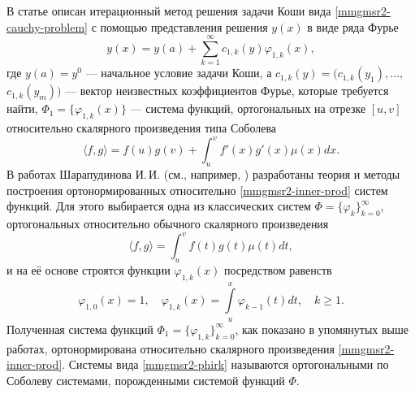 В статье \cite{mmgmsr2-SHII-Demi2017-ODESystems} описан итерационный метод решения задачи Коши вида \eqref{mmgmsr2-cauchy-problem} с помощью представления решения $y(x)$ в виде ряда Фурье
\begin{equation}\label{mmgmsr2-fourier-series-r=1}
y(x) = y(a)+\sum\limits_{k=1}^{\infty}c_{1,k}(y)\varphi_{1,k}(x),
\end{equation}
где $y(a)=y^0$ --- начальное условие задачи Коши, а $c_{1,k}(y)=(c_{1,k}(y_1),\ldots,$$c_{1,k}(y_m))$ --- вектор неизвестных коэффициентов Фурье, которые требуется найти, $\Phi_1=\{\varphi_{1,k}(x)\}$ --- система функций, ортогональных на отрезке $[u,v]$ относительно скалярного произведения типа Соболева
\begin{equation}\label{mmgmsr2-inner-prod}
\langle f,g \rangle =
f(u)g(v)+\int_{u}^{v}f'(x)g'(x)\mu(x)dx.
\end{equation}
В работах Шарапудинова И.\,И. (см., например, \cite{mmgmsr2-SharapudinovMuratova, mmgmsr2-Shii-asymp-demi2016, mmgmsr2-Shii-Gadzhieva2016, mmgmsr2-Shii-matzam2017, mmgmsr2-Shii-Shti-izvvuzov2017, mmgmsr2-Shii-lag-demi2015, mmgmsr2-SHII-MMG-Demi2015}) разработаны теория и методы построения ортонормированных относительно \eqref{mmgmsr2-inner-prod} систем функций.
Для этого выбирается одна из классических систем $\Phi =\{\varphi_k\}_{k=0}^\infty$, ортогональных
относительно обычного скалярного произведения
\begin{equation}\label{mmgmsr2-classic-mul}
\langle f,g \rangle =\int_{u}^{v}f(t)g(t)\mu(t)dt,
\end{equation}
и на её основе строятся функции $\varphi_{1,k}(x)$ посредством равенств
\begin{equation}\label{mmgmsr2-phirk}
\varphi_{1,0}(x) =1, \quad
\varphi_{1,k}(x) =\int\limits_{u}^x\varphi_{k-1}(t)dt, \quad k \ge 1.
\end{equation}
Полученная система функций $\Phi_1=\{\varphi_{1,k}\}_{k=0}^\infty$, как показано в упомянутых выше работах, ортонормирована относительно скалярного произведения \eqref{mmgmsr2-inner-prod}. Системы вида \eqref{mmgmsr2-phirk} называются ортогональными по Соболеву системами, порожденными системой функций $\Phi$.

